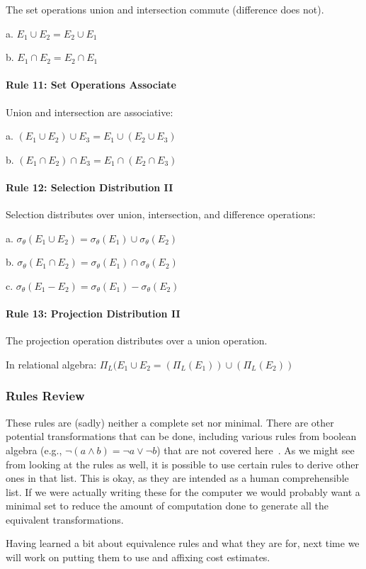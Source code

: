 The set operations union and intersection commute  (difference does not).

a. $E_{1} \cup E_{2} = E_{2} \cup E_{1}$

b. $E_{1} \cap E_{2} = E_{2} \cap E_{1}$

\paragraph{Rule 11: Set Operations Associate}
Union and intersection are associative:

a. $(E_{1} \cup E_{2}) \cup E_{3} = E_{1} \cup (E_{2} \cup E_{3})$

b. $(E_{1} \cap E_{2}) \cap E_{3} = E_{1} \cap (E_{2} \cap E_{3})$

\paragraph{Rule 12: Selection Distribution II}

Selection distributes over union, intersection, and difference operations:

a. $\sigma_{\theta}(E_{1} \cup E_{2}) = \sigma_{\theta}(E_{1}) \cup \sigma_{\theta}(E_{2})$

b. $\sigma_{\theta}(E_{1} \cap E_{2}) = \sigma_{\theta}(E_{1}) \cap \sigma_{\theta}(E_{2})$

c. $\sigma_{\theta}(E_{1} - E_{2}) = \sigma_{\theta}(E_{1}) - \sigma_{\theta}(E_{2})$

\paragraph{Rule 13: Projection Distribution II}
The projection operation distributes over a union operation.

In relational algebra: $\Pi_{L}(E_{1} \cup E_{2} = (\Pi_{L}(E_{1}))\cup(\Pi_{L}(E_{2}))$

\subsubsection*{Rules Review}

These rules are (sadly) neither a complete set nor minimal. There are other potential transformations that can be done, including various rules from boolean algebra (e.g., $\neg (a \wedge b) = \neg a \vee \neg b$) that are not covered here~\cite{fds}. As we might see from looking at the rules as well, it is possible to use certain rules to derive other ones in that list. This is okay, as they are intended as a human comprehensible list. If we were actually writing these for the computer we would probably want a minimal set to reduce the amount of computation done to generate all the equivalent transformations. 

Having learned a bit about equivalence rules and what they are for, next time we will work on putting them to use and affixing cost estimates.




